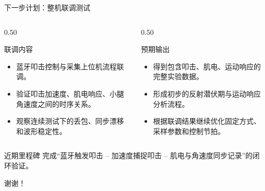 \documentclass[aspectratio=169,fontset=none]{ctexbeamer}
\begin{document}
\begin{frame}{下一步计划：整机联调测试}
  \begin{columns}
    \begin{column}{0.50\textwidth}
      \begin{block}{联调内容}
        \begin{itemize}
          \item 蓝牙叩击控制与采集上位机流程联调。
          \item 验证叩击加速度、肌电响应、小腿角速度之间的时序关系。
          \item 观察连续测试下的丢包、同步漂移和波形稳定性。
        \end{itemize}
      \end{block}
    \end{column}
    \begin{column}{0.50\textwidth}
      \begin{block}{预期输出}
        \begin{itemize}
          \item 得到包含叩击、肌电、运动响应的完整实验数据。
          \item 形成初步的反射潜伏期与运动响应分析流程。
          \item 根据联调结果继续优化固定方式、采样参数和控制节拍。
        \end{itemize}
      \end{block}
    \end{column}
  \end{columns}

  \vspace{0.22cm}
  \begin{block}{近期里程碑}
    完成“蓝牙触发叩击 -- 加速度捕捉叩击 -- 肌电与角速度同步记录”的闭环验证。
  \end{block}
\end{frame}

\begin{frame}{}
  \vspace{0.30\textheight}
  \centering
  \Huge 谢谢！
\end{frame}
\end{document}
